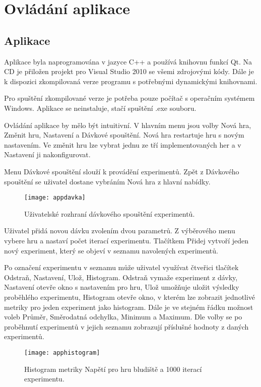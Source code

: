 \chapter{Ovládání aplikace}

\section{Aplikace}

Aplikace byla naprogramována v jazyce C++ a používá knihovnu funkcí Qt. Na CD je přiložen projekt pro Visual Studio 2010 se všemi zdrojovými kódy. Dále je k dispozici zkompilovaná verze programu s potřebnými dynamickými knihovnami.

Pro spuštění zkompilované verze je potřeba pouze počítač s operačním systémem Windows. Aplikace se neinstaluje, stačí spuštění .exe souboru.

Ovládání aplikace by mělo být intuitivní. V hlavním menu jsou volby Nová hra, Změnit hru, Nastavení a Dávkové spouštění. Nová hra restartuje hru s novým nastavením. Ve změnit hru lze vybrat jednu ze tří implementovaných her a v Nastavení ji nakonfigurovat.

Menu Dávkové spouštění slouží k provádění experimentů. Zpět z Dávkového spouštění se uživatel dostane vybráním Nová hra z hlavní nabídky.


\begin{figure}
  \centering
  \texttt{[image: appdavka]}
	\caption{Uživatelské rozhraní dávkového spouštění experimentů. }
	\label{fig-appdavka}
\end{figure}

Uživatel přidá novou dávku zvolením dvou parametrů. Z výběrového menu vybere hru a nastaví počet iterací experimentu. Tlačítkem Přidej vytvoří jeden nový experiment, který se objeví v seznamu navolených experimentů. 

Po označení experimentu v seznamu může uživatel využívat čtveřici tlačítek Odstraň, Nastavení, Ulož, Histogram. Odstraň vymaže experiment z dávky, Nastavení otevře okno s nastavením pro hru, Ulož umožňuje uložit výsledky proběhlého experimentu, Histogram otevře okno, v kterém lze zobrazit jednotlivé metriky pro jeden experiment jako histogram. Dále je ve stejném řádku možnost voleb Průměr, Směrodatná odchylka, Minimum a Maximum. Dle volby se po proběhnutí experimentů v jejich seznamu zobrazují příslušné hodnoty z daných experimentů. 

\begin{figure}
  \centering
  \texttt{[image: apphistogram]}
	\caption{Histogram metriky Napětí pro hru bludiště a 1000 iterací experimentu. }
	\label{fig-apphistogram}
\end{figure}

